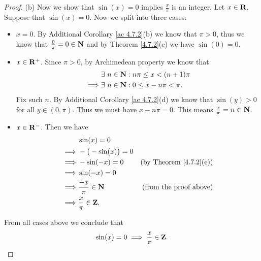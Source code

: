 \begin{proof}{(b)}
    Now we show that \(\sin(x) = 0\) implies \(\frac{x}{\pi}\) is an integer.
    Let \(x \in \mathbf{R}\).
    Suppose that \(\sin(x) = 0\).
    Now we split into three cases:
    \begin{itemize}
        \item \(x = 0\).
              By Additional Corollary \ref{ac 4.7.2}(b) we know that \(\pi > 0\), thus we know that \(\frac{0}{\pi} = 0 \in \mathbf{N}\) and by Theorem \ref{4.7.2}(e) we have \(\sin(0) = 0\).
        \item \(x \in \mathbf{R}^+\).
              Since \(\pi > 0\), by Archimedean property we know that
              \begin{align*}
                           & \exists\ n \in \mathbf{N} : n \pi \leq x < (n + 1) \pi \\
                  \implies & \exists\ n \in \mathbf{N} : 0 \leq x - n \pi < \pi.
              \end{align*}
              Fix such \(n\).
              By Additional Corollary \ref{ac 4.7.2}(d) we know that \(\sin(y) > 0\) for all \(y \in (0, \pi)\).
              Thus we must have \(x - n \pi = 0\).
              This means \(\frac{x}{\pi} = n \in \mathbf{N}\).
        \item \(x \in \mathbf{R}^-\).
              Then we have
              \begin{align*}
                           & \sin(x) = 0                                                  \\
                  \implies & -\big(-\sin(x)\big) = 0                                      \\
                  \implies & -\sin(-x) = 0           & \text{(by Theorem \ref{4.7.2}(e))} \\
                  \implies & \sin(-x) = 0                                                 \\
                  \implies & \frac{-x}{\pi} \in \mathbf{N}   & \text{(from the proof above)}      \\
                  \implies & \frac{x}{\pi} \in \mathbf{Z}.
              \end{align*}
    \end{itemize}
    From all cases above we conclude that
    \[
        \sin(x) = 0 \implies \frac{x}{\pi} \in \mathbf{Z}.
    \]
\end{proof}

